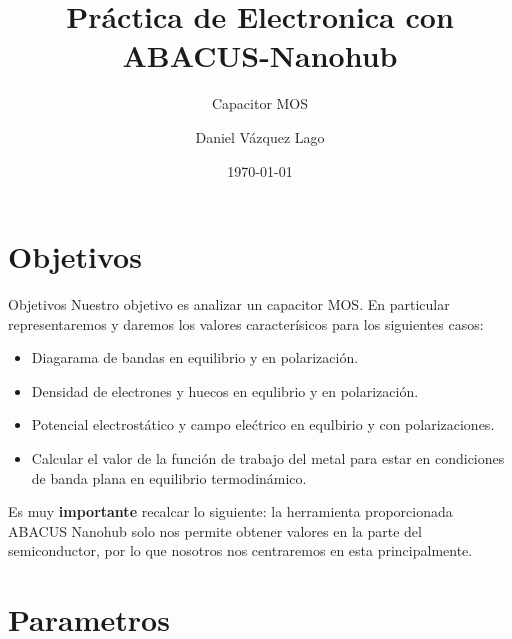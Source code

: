 \documentclass{/home/daniel/GitHub/USC-Physics-Degree-Notes/Notes/Presentacion}
\title{Práctica de Electronica con ABACUS-Nanohub}
\subtitle{Capacitor MOS}
\author{Daniel Vázquez Lago}
\date{\today} %
\begin{document}
\begin{frame}
    \titlepage
\end{frame}
\begin{frame}
    \tableofcontents
\end{frame}

\section{Objetivos}
\begin{frame}{Objetivos}
    Nuestro objetivo es analizar un capacitor MOS. En particular representaremos y daremos los valores caracterísicos para los siguientes casos:
    \begin{itemize}
        \item Diagarama de bandas en equilibrio y en polarización.
        \item Densidad de electrones y huecos en equlibrio y en polarización.
        \item Potencial electrostático y campo elećtrico en equlbirio y con polarizaciones.
        \item Calcular el valor de la función de trabajo del metal para estar en condiciones de banda plana en equilibrio termodinámico. 
    \end{itemize}
    Es muy \textbf{importante} recalcar lo siguiente: la herramienta proporcionada ABACUS Nanohub solo nos permite obtener valores en la parte del semiconductor, por lo que nosotros nos centraremos en esta principalmente.
\end{frame}


\section{Parametros}
\end{document}

